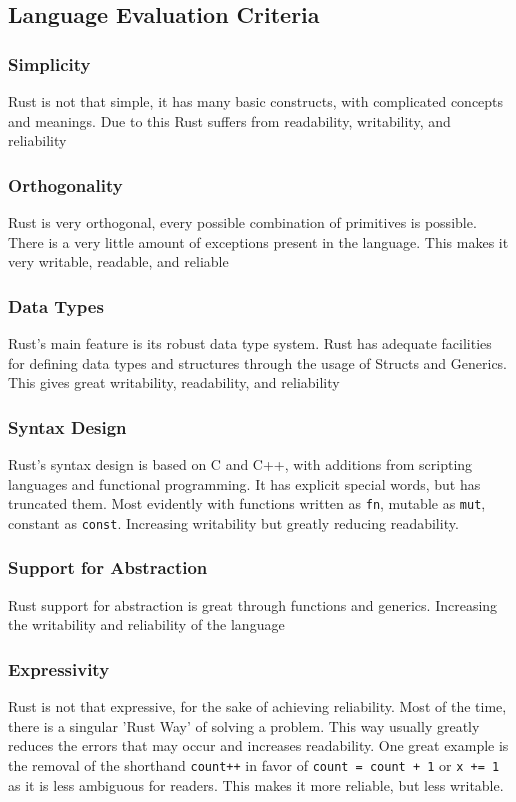 \documentclass{article}
\newcommand{\rustin}[1]{\texttt{#1}}
\begin{document}
  \subsection{Language Evaluation Criteria}

  \subsubsection{Simplicity}
  Rust is not that simple, it has many basic constructs, with complicated
  concepts and meanings. Due to this Rust suffers from readability, writability,
  and reliability

  \subsubsection{Orthogonality}
  Rust is very orthogonal, every possible combination of primitives is possible.
  There is a very little amount of exceptions present in the language. This
  makes it very writable, readable, and reliable

  \subsubsection{Data Types}
  Rust's main feature is its robust data type system. Rust has adequate
  facilities for defining data types and structures through the usage of Structs
  and Generics. This gives great writability, readability, and reliability

  \subsubsection{Syntax Design}
  Rust's syntax design is based on C and C++, with additions from scripting
  languages and functional programming. It has explicit special words, but has
  truncated them. Most evidently with functions written as \rustin{fn}, mutable
  as \rustin{mut}, constant as \rustin{const}. Increasing writability but
  greatly reducing readability.

  \subsubsection{Support for Abstraction}
  Rust support for abstraction is great through functions and generics.
  Increasing the writability and reliability of the language

  \subsubsection{Expressivity}
  Rust is not that expressive, for the sake of achieving reliability. Most of
  the time, there is a singular 'Rust Way' of solving a problem. This way
  usually greatly reduces the errors that may occur and increases readability.
  One great example is the removal of the shorthand \texttt{count++} in
  favor of \rustin{count = count + 1} or \rustin{x += 1} as it is less ambiguous
  for readers. This makes it more reliable, but less writable.
\end{document}

